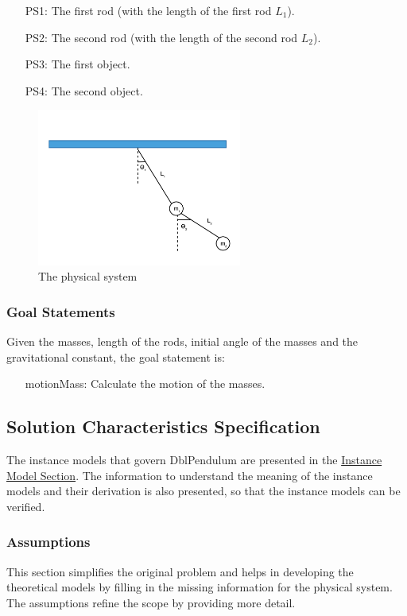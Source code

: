 \documentclass[12pt]{article}
\begin{document}
\begin{itemize}
\item[PS1:]{The first rod (with the length of the first rod ${L_{1}}$).}
\item[PS2:]{The second rod (with the length of the second rod ${L_{2}}$).}
\item[PS3:]{The first object.}
\item[PS4:]{The second object.}
\end{itemize}
\begin{figure}
\begin{center}
\includegraphics[width=0.6\textwidth]{../../../../datafiles/dblpendulum/dblpendulum.png}
\caption{The physical system}
\label{Figure:dblpendulum}
\end{center}
\end{figure}
\subsubsection{Goal Statements}
\label{Sec:GoalStmt}
Given the masses, length of the rods, initial angle of the masses and the gravitational constant, the goal statement is:

\begin{itemize}
\item[motionMass:\phantomsection\label{motionMass}]{Calculate the motion of the masses.}
\end{itemize}
\subsection{Solution Characteristics Specification}
\label{Sec:SolCharSpec}
The instance models that govern DblPendulum are presented in the \hyperref[Sec:IMs]{Instance Model Section}. The information to understand the meaning of the instance models and their derivation is also presented, so that the instance models can be verified.

\subsubsection{Assumptions}
\label{Sec:Assumps}
This section simplifies the original problem and helps in developing the theoretical models by filling in the missing information for the physical system. The assumptions refine the scope by providing more detail.
\end{document}
